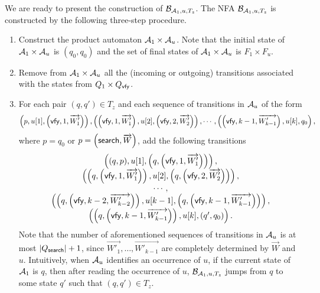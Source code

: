 We are ready to present the construction of $\mathcal{B}_{\mathcal{A}_1, u,  T_{z}}$. The NFA $\mathcal{B}_{\mathcal{A}_1, u, T_{z}}$ is constructed by the following three-step procedure.
\begin{enumerate}
\item Construct the product automaton $\mathcal{A}_1 \times \mathcal{A}_u$. Note that the initial state of $\mathcal{A}_1 \times \mathcal{A}_u$ is $(q_{0},q_0)$ and the set of final states of $\mathcal{A}_1 \times \mathcal{A}_u$ is $F_1 \times F_u$.

\item Remove from $\mathcal{A}_1 \times \mathcal{A}_u$ all the (incoming or outgoing) transitions associated with the states from $Q_1 \times Q_{\mathsf{vfy}}$.

\item For each pair $(q,q') \in T_{z}$ and each sequence of transitions in $\mathcal{A}_u$ of the form
$$
\left(p, u[1], \left(\mathsf{vfy}, 1, \overrightarrow{W'_1} \right) \right), \left( \left(\mathsf{vfy}, 1, \overrightarrow{W'_1} \right), u[2],
 \left(\mathsf{vfy}, 2, \overrightarrow{W'_2}\right) \right),
 \cdots, \left(\left(\mathsf{vfy}, k-1, \overrightarrow{W'_{k-1}} \right), u[k], q_0\right),
$$
where  $p=q_0$ or $p = \left(\mathsf{search}, \overrightarrow{W} \right)$,
add the following transitions
$$
\begin{array}{c}
\left((q,p), u[1], \left(q, \left(\mathsf{vfy}, 1, \overrightarrow{W'_1} \right) \right) \right),
\\
\left( \left(q, \left(\mathsf{vfy}, 1, \overrightarrow{W'_1} \right) \right), u[2], \left(q, \left(\mathsf{vfy}, 2, \overrightarrow{W'_2}\right)\right)\right),
\\
\cdots, \\
\left(\left(q, \left(\mathsf{vfy}, k-2, \overrightarrow{W'_{k-2}} \right) \right), u[k-1], \left (q, \left (\mathsf{vfy}, k-1, \overrightarrow{W'_{k-1}} \right) \right) \right),
\\
\left( \left(q, \left (\mathsf{vfy}, k-1, \overrightarrow{W'_{k-1}} \right) \right), u[k], \left(q', q_0 \right)\right).
\end{array}
$$
Note that the number of aforementioned sequences of transitions in $\mathcal{A}_u$ is at most $|Q_{\mathsf{search}}|+1$, since  $ \overrightarrow{W'_1},\dots,  \overrightarrow{W'_{k-1}}$ are completely determined by $\overrightarrow{W} $ and $u$.
Intuitively, when $\mathcal{A}_u$ identifies an occurrence of $u$, if the current state of $\mathcal{A}_1$ is $q$, then after reading the occurrence of $u$, $\mathcal{B}_{\mathcal{A}_1, u, T_z}$ jumps from $q$ to some state $q'$ such that $(q,q') \in T_z$.
\end{enumerate}

